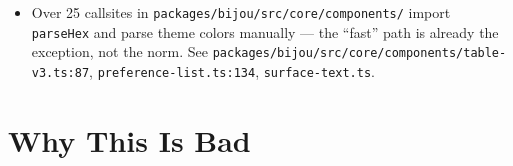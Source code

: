 \begin{itemize}
\item
  Over 25 callsites in \texttt{p\allowbreak{}a\allowbreak{}c\allowbreak{}k\allowbreak{}a\allowbreak{}g\allowbreak{}e\allowbreak{}s\allowbreak{}/\allowbreak{}b\allowbreak{}i\allowbreak{}j\allowbreak{}o\allowbreak{}u\allowbreak{}/\allowbreak{}s\allowbreak{}r\allowbreak{}c\allowbreak{}/\allowbreak{}c\allowbreak{}o\allowbreak{}r\allowbreak{}e\allowbreak{}/\allowbreak{}c\allowbreak{}o\allowbreak{}m\allowbreak{}p\allowbreak{}o\allowbreak{}n\allowbreak{}e\allowbreak{}n\allowbreak{}t\allowbreak{}s\allowbreak{}/} import \texttt{p\allowbreak{}a\allowbreak{}r\allowbreak{}s\allowbreak{}e\allowbreak{}H\allowbreak{}e\allowbreak{}x} and parse theme colors manually --- the ``fast'' path is already the exception, not the norm. See \texttt{p\allowbreak{}a\allowbreak{}c\allowbreak{}k\allowbreak{}a\allowbreak{}g\allowbreak{}e\allowbreak{}s\allowbreak{}/\allowbreak{}b\allowbreak{}i\allowbreak{}j\allowbreak{}o\allowbreak{}u\allowbreak{}/\allowbreak{}s\allowbreak{}r\allowbreak{}c\allowbreak{}/\allowbreak{}c\allowbreak{}o\allowbreak{}r\allowbreak{}e\allowbreak{}/\allowbreak{}c\allowbreak{}o\allowbreak{}m\allowbreak{}p\allowbreak{}o\allowbreak{}n\allowbreak{}e\allowbreak{}n\allowbreak{}t\allowbreak{}s\allowbreak{}/\allowbreak{}t\allowbreak{}a\allowbreak{}b\allowbreak{}l\allowbreak{}e\allowbreak{}-\allowbreak{}v\allowbreak{}3\allowbreak{}.\allowbreak{}t\allowbreak{}s\allowbreak{}:\allowbreak{}8\allowbreak{}7}, \texttt{p\allowbreak{}r\allowbreak{}e\allowbreak{}f\allowbreak{}e\allowbreak{}r\allowbreak{}e\allowbreak{}n\allowbreak{}c\allowbreak{}e\allowbreak{}-\allowbreak{}l\allowbreak{}i\allowbreak{}s\allowbreak{}t\allowbreak{}.\allowbreak{}t\allowbreak{}s\allowbreak{}:\allowbreak{}1\allowbreak{}3\allowbreak{}4}, \texttt{s\allowbreak{}u\allowbreak{}r\allowbreak{}f\allowbreak{}a\allowbreak{}c\allowbreak{}e\allowbreak{}-\allowbreak{}t\allowbreak{}e\allowbreak{}x\allowbreak{}t\allowbreak{}.\allowbreak{}t\allowbreak{}s}.
\end{itemize}

\section{Why This Is Bad}\label{record-367-why-this-is-bad}

